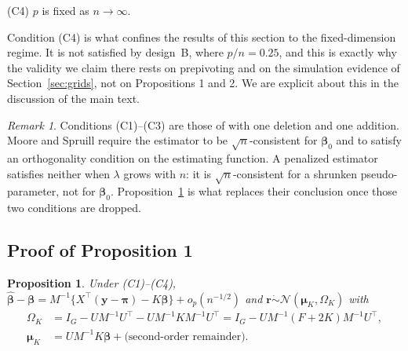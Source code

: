 \documentclass[11pt,a4paper]{article}
\newcommand{\bb}{\boldsymbol{\beta}}
\newcommand{\bbh}{\hat{\boldsymbol{\beta}}}
\newcommand{\by}{\boldsymbol{y}}
\newcommand{\bpi}{\boldsymbol{\pi}}
\newcommand{\br}{\boldsymbol{r}}
\newcommand{\bmu}{\boldsymbol{\mu}}
\theoremstyle{plain}
\newtheorem{proposition}{Proposition}
\theoremstyle{remark}
\newtheorem{remark}{Remark}
\begin{document}
(C4) $p$ is fixed as $n \to \infty$.

Condition (C4) is what confines the results of this section to the fixed-dimension
regime. It is not satisfied by design~B, where $p/n = 0.25$, and this is exactly why the
validity we claim there rests on prepivoting and on the simulation evidence of
Section~\ref{sec:grids}, not on Propositions 1 and 2. We are explicit about this in the
discussion of the main text.

\begin{remark}
Conditions (C1)--(C3) are those of \citet{moore1975} with one deletion and one addition.
Moore and Spruill require the estimator to be $\sqrt{n}$-consistent for $\bb_0$ and to
satisfy an orthogonality condition on the estimating function. A penalized estimator
satisfies neither when $\lambda$ grows with $n$: it is $\sqrt{n}$-consistent for a
shrunken pseudo-parameter, not for $\bb_0$. Proposition~\ref{prop:law} is what replaces
their conclusion once those two conditions are dropped.
\end{remark}

\subsection{Proof of Proposition 1}\label{sec:proof1}

\begin{proposition}\label{prop:law}
Under (C1)--(C4),
$\bbh - \bb = M^{-1}\{X^{\top}(\by-\bpi) - K\bb\} + o_p(n^{-1/2})$ and
$\br \mathrel{\dot\sim} \mathcal{N}(\bmu_K, \Omega_K)$ with
\begin{align*}
  \Omega_K &= I_G - UM^{-1}U^{\top} - UM^{-1}KM^{-1}U^{\top}
            = I_G - UM^{-1}(F+2K)M^{-1}U^{\top}, \\
  \bmu_K   &= UM^{-1}K\bb + \text{(second-order remainder)}.
\end{align*}
\end{proposition}
\end{document}
